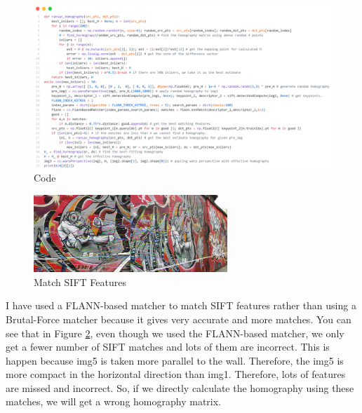 \documentclass[a4paper]{article}
\begin{document}
\begin{figure}[!htb]
  \centering
  \includegraphics[width=\textwidth]{images/q3code.png}
  \caption{Code}
  \label{q3code}
\end{figure}
\begin{figure}[!htb]
  \centering
  \includegraphics[width=0.65\textwidth]{images/stif.png}
  \caption{Match SIFT Features}
  \label{sift}
\end{figure}
I have used a FLANN-based matcher to match SIFT features rather
 than using a Brutal-Force matcher because it gives very accurate
  and more matches. You can see that in Figure \ref{sift},  even though we
   used the FLANN-based matcher, we only get a fewer number of SIFT
    matches and lots of them are incorrect. This is happen because
     img5 is taken more parallel to the wall. Therefore, the img5
      is more compact in the horizontal direction than img1.
       Therefore, lots of features are missed and incorrect.
        So, if we directly calculate the homography using these 
        matches, we will get a wrong homography matrix.
  
\end{document}
